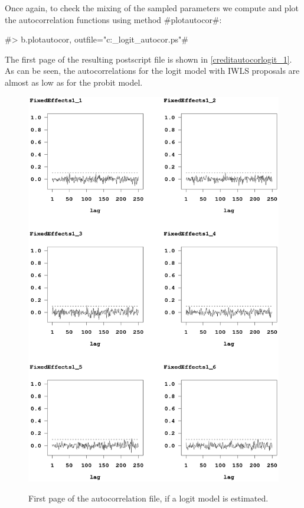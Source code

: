 Once again, to check the mixing of the sampled parameters we compute
and plot the autocorrelation functions using method #plotautocor#:

#> b.plotautocor, outfile="c:\results\credit_logit_autocor.ps"#

The first page of the resulting postscript file is shown in
\autoref{creditautocorlogit_1}. As can be seen, the autocorrelations
for the logit model with IWLS proposals are almost as low as for the
probit model.

\begin{figure}[ht]
\vspace{0.5cm}
\begin{center}
\includegraphics[scale=0.8]{grafiken/credit_logit_autocor1.ps}
\end{center}
{\em\caption{ \label{creditautocorlogit_1} First page of the
autocorrelation file, if a logit model is estimated.}}
\end{figure}

